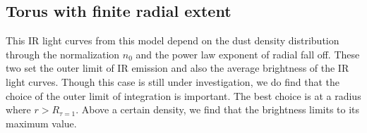 \subsection{Torus with finite radial extent}

This IR light curves from this model depend on the dust density distribution through the normalization $n_0$ and the power law exponent of radial fall off. These two set the outer limit of IR emission and also the average brightness of the IR light curves. Though this case is still under investigation, we do find that the choice of the outer limit of integration is important. The best choice is at a radius where $r>R_{\tau=1}$. Above a certain density, we find that the brightness limits to its maximum value.














